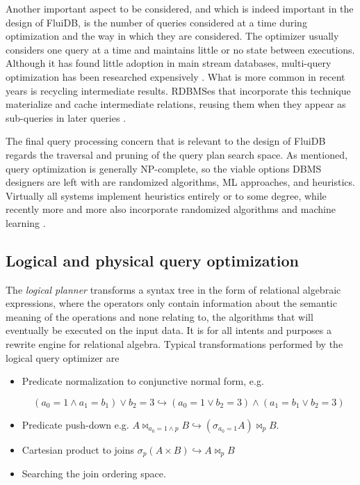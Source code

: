 Another important aspect to be considered, and which is indeed
important in the design of FluiDB, is the number of queries considered
at a time during optimization and the way in which they are
considered. The optimizer usually considers one query at a time and
maintains little or no state between executions. Although it has found
little adoption in main stream databases, multi-query optimization has
been researched expensively
\cite{michiardiCachebasedMultiqueryOptimization2021,wangMultiqueryOptimizationMapreduce2013,royEfficientExtensibleAlgorithms2000,rogersMultiqueryOptimization2017}. What
is more common in recent years is recycling intermediate
results. RDBMSes that incorporate this technique materialize and cache
intermediate relations, reusing them when they appear as sub-queries
in later queries
\cite{perezHistoryawareQueryOptimization2014,nagelRecyclingPipelinedQuery2013,ivanovaArchitectureRecyclingIntermediates2010}.

The final query processing concern that is relevant to the design of
FluiDB regards the traversal and pruning of the query plan search space. As
mentioned, query optimization is generally NP-complete, so the viable
options DBMS designers are left with are randomized algorithms, ML
approaches, and heuristics. Virtually all systems implement heuristics
entirely or to some degree, while recently more and more also
incorporate randomized algorithms
\cite{chandeGeneticOptimizationJoin2011} and machine learning
\cite{liMachineLearningDatabases2021,marcusNeoLearnedQuery2019}.

\subsection{Logical and physical query optimization}

The \emph{logical planner} transforms a syntax tree in the form of
relational algebraic expressions, where the operators only contain
information about the semantic meaning of the operations and none relating
to, the algorithms that will eventually be executed on the input
data. It is for all intents and purposes a rewrite engine for
relational algebra. Typical transformations performed by the logical
query optimizer are

\begin{itemize}
\item Predicate normalization to conjunctive normal form, e.g.

 \[(a_0 = 1
  \land a_1 = b_1) \lor b_2 = 3 \hookrightarrow (a_0 = 1 \lor b_2 = 3)
  \land (a_1 = b_1 \lor b_2 = 3)\]

\item Predicate push-down e.g. \(A \Join_{a_0 = 1 \land p} B
  \hookrightarrow (\sigma_{a_0 = 1} A) \Join_p B\).
\item Cartesian product to joins \(\sigma_p ( A \times B )
  \hookrightarrow A \Join_p B\)
\item Searching the join ordering space.
\end{itemize}

